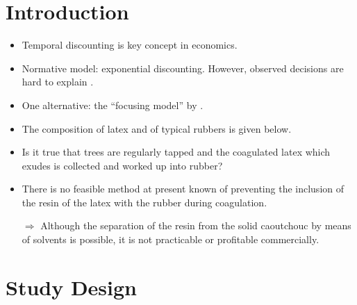 

\section{Introduction}


\begin{frame}{\titleprefix}

	\begin{itemize}
		\item Temporal discounting is key concept in economics.
		\item Normative model: exponential discounting. However, observed decisions are hard to explain \citep[e.g.,][]{Dohmen2012}.
		\item One alternative: the ``focusing model'' by \cite{Koszegi2013}.
	\end{itemize}
	
	\begin{itemize}
		\item The composition of latex and of typical rubbers is given below.
		\item Is it true that trees are regularly tapped and the coagulated latex which exudes is collected and worked up into rubber?
	\end{itemize}

\end{frame}


\begin{frame}{\titleprefix}

	\begin{itemize}
		\item There is no feasible method at present known of preventing the inclusion of the resin of the latex with the rubber during coagulation.
		\item[$\Rightarrow$] Although the separation of the resin from the solid caoutchouc by means of solvents is possible, it is not practicable or profitable commercially.
	\end{itemize}

\end{frame}


\section{Study Design}



